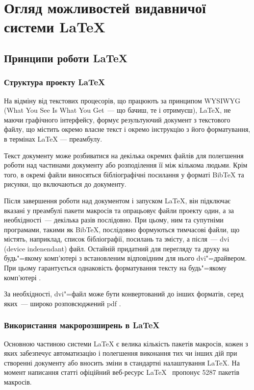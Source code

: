 \chapter{Огляд можливостей видавничої системи \LaTeX{} } 
\label{chapter:first}

\section{Принципи роботи \LaTeX{}}

\subsection{Структура проекту \LaTeX{}}

На відміну від текстових процесорів, що працюють за принципом {WYSIWYG} (What You See Is What You Get~--- що бачиш, те і отримуєш), \LaTeX{}, не маючи графічного інтерфейсу, формує результуючий документ з текстового файлу, що містить окремо власне текст і окремо інструкцію з його форматування, в термінах \LaTeX{} --- преамбулу.

Текст документу може розбиватися на декілька окремих файлів для полегшення роботи над частинами документу або розподілення її між кількома людьми. Крім того, в окремі файли виносяться бібліографічні посилання у форматі BibTeX та рисунки, що включаються до документу. 

Після завершення роботи над документом і запуском \LaTeX{}, він підключає вказані у преамбулі пакети макросів та опрацьовує файли проекту один, а за необхідності~--- декілька разів послідовно. При цьому, ним та супутніми програмами, такими як BibTeX, послідовно формуються тимчасові файли, що містять, наприклад, список бібліографії, посилань та змісту, а після~--- dvi (device indenendant) файл. Остайній придатний для перегляду та друку на будь"=якому комп'ютері з встановленим відповідним для нього dvi"=драйвером. При цьому гарантується однаковість форматування тексту на будь"=якому комп'ютері \cite[с.~16]{Lvovskii2010NaborVerstka}.

За необхідності, dvi"=файл може бути конвертований до інших форматів, серед яких~--- широко розповсюджений pdf \cite{Habr2012BacDiplom}\cite{Habr2012TempDisser}.

\subsection{Використання макророзширень в \LaTeX{}}

Основною частиною системи LaTeX є велика кількість пакетів макросів, кожен з яких забезпечує автоматизацію і полегшення виконання тих чи інших дій при створенні документу або вносить зміни в стандартні налаштування \LaTeX{}. На момент написання статті офіційний веб-ресурс LaTeX~\cite{www:ctan} пропонує 5287 пакетів макросів. 

